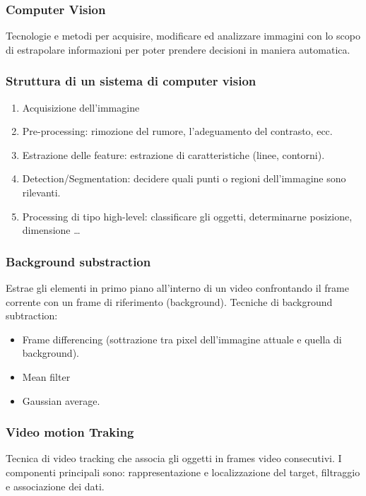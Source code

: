 \documentclass[8pt,a4paper]{article}
\begin{document}
\begin{multicols}{5}
    \subsubsection{Computer Vision}
    Tecnologie e metodi per acquisire, modificare ed analizzare immagini con lo 
    scopo di estrapolare informazioni per poter prendere decisioni in maniera automatica.

    \subsubsection{Struttura di un sistema di computer vision}
    \begin{enumerate}
      \item Acquisizione dell’immagine
      \item Pre-processing: rimozione del rumore, l’adeguamento del contrasto, ecc.
      \item Estrazione delle feature: estrazione di caratteristiche (linee, contorni).
      \item Detection/Segmentation: decidere quali punti o regioni dell’immagine sono 
      rilevanti.
      \item Processing di tipo high-level: classificare gli oggetti, determinarne 
      posizione, dimensione …
    \end{enumerate}
    
    \subsubsection{Background substraction}
    Estrae gli elementi in primo piano all’interno di un video confrontando il frame 
    corrente con un frame di riferimento (background). Tecniche di background subtraction: 
    \begin{itemize}
      \item Frame differencing (sottrazione tra pixel dell’immagine attuale e quella di 
      background).
      \item Mean filter
      \item Gaussian average.
    \end{itemize}

    \subsubsection{Video motion Traking}
    Tecnica di video tracking che associa gli oggetti in frames video consecutivi. I 
    componenti principali sono: rappresentazione e localizzazione del target, 
    filtraggio e associazione dei dati.


\end{multicols}
\end{document}

